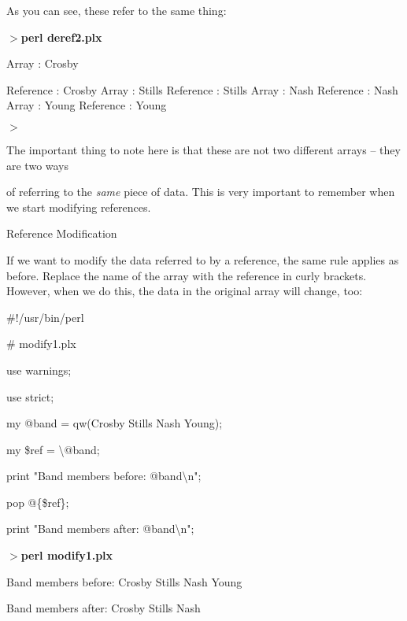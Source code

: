 \documentclass[a4paper,11pt]{book}
\begin{document}
\noindent 

\noindent As you can see, these refer to the same thing:

\noindent 

\noindent $>$\textbf{perl deref2.plx}

\noindent Array : Crosby

\noindent Reference : Crosby Array : Stills Reference : Stills Array : Nash Reference : Nash Array : Young Reference : Young

\noindent $>$

\noindent 

\noindent The  important thing to  note here  is  that  these  are  not  two  different  arrays  --  they  are two  ways

\noindent of referring  to  the  \textit{same  }piece of  data.  This  is very  important  to  remember  when  we  start modifying references.

\noindent 

\noindent 

\noindent Reference Modification

\noindent 

\noindent If we want to modify the data referred to by a reference, the same rule applies as before. Replace the name of the array with the reference in curly brackets. However, when we do this, the data in the original array will change, too:

\noindent 

\noindent \#!/usr/bin/perl

\noindent \# modify1.plx

\noindent use warnings;

\noindent use strict;

\noindent 

\noindent my @band = qw(Crosby Stills Nash Young);

\noindent my \$ref  = \textbackslash @band;

\noindent print "Band members before: @band\textbackslash n";

\noindent pop @\{\$ref\};

\noindent print "Band members after: @band\textbackslash n";

\noindent 

\noindent $>$\textbf{perl modify1.plx}

\noindent Band members before: Crosby Stills Nash Young

\noindent Band members after: Crosby Stills Nash
\end{document}

